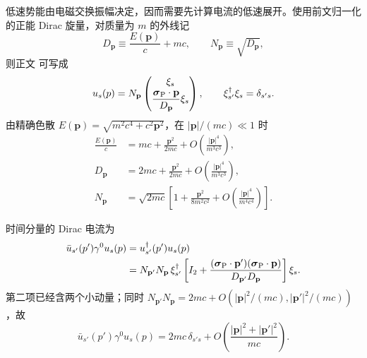 \begin{derivation}
低速势能由电磁交换振幅决定，因而需要先计算电流的低速展开。使用前文归一化的正能 Dirac 旋量，对质量为 $m$ 的外线记
\begin{equation*}
 D_{\mathbf p}\equiv \frac{E(\mathbf p)}{c}+mc,
 \qquad
 N_{\mathbf p}\equiv\sqrt{D_{\mathbf p}},
\end{equation*}
则正文 可写成
\begin{equation*}
 u_s(p)=N_{\mathbf p}
 \begin{pmatrix}
 \xi_s\\[1mm]
 \dfrac{\boldsymbol\sigma_{\rm P}\cdot\mathbf p}{D_{\mathbf p}}\xi_s
 \end{pmatrix},
 \qquad
 \xi_{s'}^\dagger\xi_s=\delta_{s's}.
\end{equation*}
由精确色散
$E(\mathbf p)=\sqrt{m^2c^4+c^2\mathbf p^2}$，在
$|\mathbf p|/(mc)\ll1$ 时
\begin{align*}
 \frac{E(\mathbf p)}{c}
 &=mc+\frac{\mathbf p^2}{2mc}
 +O\!\left(\frac{|\mathbf p|^4}{m^3c^3}\right),\\
 D_{\mathbf p}
 &=2mc+\frac{\mathbf p^2}{2mc}
 +O\!\left(\frac{|\mathbf p|^4}{m^3c^3}\right),\\
 N_{\mathbf p}
 &=\sqrt{2mc}\left[
 1+\frac{\mathbf p^2}{8m^2c^2}
 +O\!\left(\frac{|\mathbf p|^4}{m^4c^4}\right)
 \right].
\end{align*}

时间分量的 Dirac 电流为
\begin{align*}
 \bar u_{s'}(p')\gamma^0u_s(p)
 &=u_{s'}^\dagger(p')u_s(p)\\
 &=N_{\mathbf p'}N_{\mathbf p}\,
 \xi_{s'}^\dagger\left[
 I_2+
 \frac{(\boldsymbol\sigma_{\rm P}\cdot\mathbf p')
       (\boldsymbol\sigma_{\rm P}\cdot\mathbf p)}
 {D_{\mathbf p'}D_{\mathbf p}}
 \right]\xi_s.
\end{align*}
第二项已经含两个小动量；同时
$N_{\mathbf p'}N_{\mathbf p}=2mc+O(|\mathbf p|^2/(mc),|\mathbf p'|^2/(mc))$，故
\begin{equation*}
 \boxed{
 \bar u_{s'}(p')\gamma^0u_s(p)
 =2mc\,\delta_{s's}
 +O\!\left(\frac{|\mathbf p|^2+|\mathbf p'|^2}{mc}\right).}
\end{equation*}


\end{derivation}
